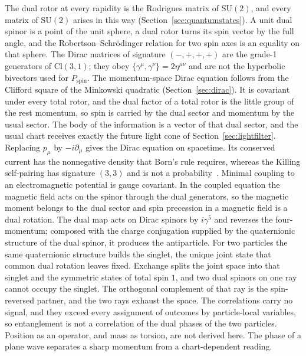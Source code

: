 \documentclass[a4paper]{article}
\begin{document}
The dual rotor at every rapidity is the Rodrigues matrix of $\mathrm{SU}(2)$, and every matrix of $\mathrm{SU}(2)$ arises in this way (Section~\ref{sec:quantumstates}). A unit dual spinor is a point of the unit sphere, a dual rotor turns its spin vector by the full angle, and the Robertson--Schrödinger relation for two spin axes is an equality on that sphere. The Dirac matrices of signature $(-,+,+,+)$ are the grade-1 generators of $\mathrm{Cl}(3,1)$; they obey $\{\gamma^\mu,\gamma^\nu\}=2\eta^{\mu\nu}$ and are not the hyperbolic bivectors used for $P_{\mathrm{spin}}$. The momentum-space Dirac equation follows from the Clifford square of the Minkowski quadratic (Section~\ref{sec:dirac}). It is covariant under every total rotor, and the dual factor of a total rotor is the little group of the rest momentum, so spin is carried by the dual sector and momentum by the usual sector. The body of the information is a vector of that dual sector, and the usual chart receives exactly the future light cone of Section~\ref{sec:lightfilter}. Replacing $p_\mu$ by $-i\partial_\mu$ gives the Dirac equation on spacetime. Its conserved current has the nonnegative density that Born's rule requires, whereas the Killing self-pairing has signature $(3,3)$ and is not a probability~\cite{dst-d4l}. Minimal coupling to an electromagnetic potential is gauge covariant. In the coupled equation the magnetic field acts on the spinor through the dual generators, so the magnetic moment belongs to the dual sector and spin precession in a magnetic field is a dual rotation. The dual map acts on Dirac spinors by $i\gamma^5$ and reverses the four-momentum; composed with the charge conjugation supplied by the quaternionic structure of the dual spinor, it produces the antiparticle. For two particles the same quaternionic structure builds the singlet, the unique joint state that common dual rotation leaves fixed. Exchange splits the joint space into that singlet and the symmetric states of total spin $1$, and two dual spinors on one ray cannot occupy the singlet. The orthogonal complement of that ray is the spin-reversed partner, and the two rays exhaust the space. The correlations carry no signal, and they exceed every assignment of outcomes by particle-local variables, so entanglement is not a correlation of the dual phases of the two particles. Position as an operator, and mass as torsion, are not derived here. The phase of a plane wave separates a sharp momentum from a chart-dependent reading.
\end{document}
